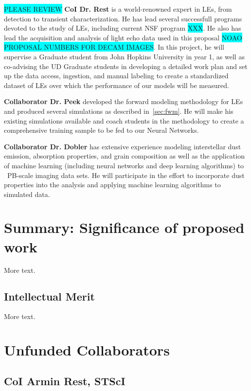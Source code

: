 \documentclass{proposalnsf}
\newcommand{\armin}[1]{\colorbox{cyan}{#1}}
\begin{document}
\armin{PLEASE REVIEW}
{\bf CoI Dr. Rest} is a world-renowned expert in LEs, from detection to transient characterization.  He has lead several successfull programs devoted to the study of LEs, including current NSF program \armin{XXX}.  He also has lead the acquisition and analysis of light echo data used in this proposal \armin{NOAO PROPOSAL NUMBERS FOR DECAM IMAGES}.  In this project, he will supervise a Graduate student from John Hopkins University in year 1, as well as co-advising the UD Graduate students in developing a detailed work plan and set up the data access, ingestion, and manual labeling to create a standardized dataset of LEs over which the performance of our models will be measured.   


{\bf Collaborator Dr. Peek} developed the forward modeling methodology for LEs and produced several simulations as described in~\autoref{sec:fwm}.  He will make his existing simulations available and coach students in the methodology to create a comprehensive training sample to be fed to our Neural Networks.  

{\bf Collaborator Dr. Dobler} has extensive experience modeling interstellar dust emission, absorption properties, and grain composition as well as the application of machine learning (including neural networks and deep learning algorithms) to ~PB-scale imaging data sets. He will participate in the effort to incorporate dust properties into the analysis and applying machine learning algorithms to simulated data.




\section{Summary: Significance of proposed work}

More text.

\subsection{Intellectual Merit}

More text.
\section{Unfunded Collaborators}

\subsection{CoI Armin Rest, STScI}
\end{document}

